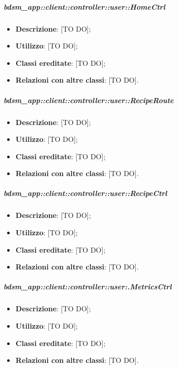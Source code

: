 		\subparagraph{bdsm\_app::client::controller::user::HomeCtrl} %
		\label{subp:client_controller_user_homectrl}
			\begin{itemize}
				\item \textbf{Descrizione}: [TO DO];
				\item \textbf{Utilizzo}: [TO DO];
				\item \textbf{Classi ereditate}: [TO DO];
				\item \textbf{Relazioni con altre classi}: [TO DO].
			\end{itemize}

		\subparagraph{bdsm\_app::client::controller::user::RecipeRoute} %
		\label{subp:bdsm_app_client_controller_user_reciperouteconfig}
			\begin{itemize}
				\item \textbf{Descrizione}: [TO DO];
				\item \textbf{Utilizzo}: [TO DO];
				\item \textbf{Classi ereditate}: [TO DO];
				\item \textbf{Relazioni con altre classi}: [TO DO].
			\end{itemize}

		\subparagraph{bdsm\_app::client::controller::user::RecipeCtrl} %
		\label{subp:client_controller_user_recipectrl}
			\begin{itemize}
				\item \textbf{Descrizione}: [TO DO];
				\item \textbf{Utilizzo}: [TO DO];
				\item \textbf{Classi ereditate}: [TO DO];
				\item \textbf{Relazioni con altre classi}: [TO DO].
			\end{itemize}

		\subparagraph{bdsm\_app::client::controller::user:.MetricsCtrl} %
		\label{subp:client_controller_user_metricsctrl}
			\begin{itemize}
				\item \textbf{Descrizione}: [TO DO];
				\item \textbf{Utilizzo}: [TO DO];
				\item \textbf{Classi ereditate}: [TO DO];
				\item \textbf{Relazioni con altre classi}: [TO DO].
			\end{itemize}

